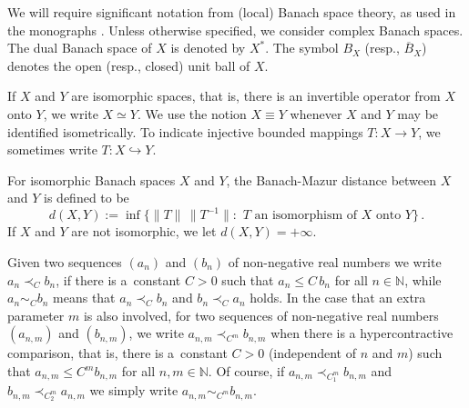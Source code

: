 \documentclass[12pt]{amsart}
\numberwithin{subsection}{section}
\theoremstyle{definition}
\theoremstyle{remark}
\begin{document}
We will require significant notation from (local) Banach space theory, as used in the monographs \cite{diestel1995absolutely, LT1,
pisier1986factorization, tomczak1989banach}. Unless otherwise specified, we consider complex Banach spaces. The dual Banach space
of $X$ is denoted by $X^\ast$.%
The symbol $B_X$
(resp., $\overline{B}_X$) denotes the open (resp., closed) unit ball of $X$.

If $X$ and $Y$ are isomorphic spaces, that is, there is an invertible operator from $X$ onto $Y$, we write $X\simeq Y$. We use the
notion $X\equiv Y$ whenever $X$ and $Y$ may be identified isometrically. To indicate injective bounded mappings $T\colon X \to Y$,
we sometimes write $T\colon X \hookrightarrow Y$.

For isomorphic Banach spaces $X$ and $Y$, the Banach-Mazur  distance between $X$ and $Y$ is defined to be
\[
d(X, Y):=\inf \big\{\|T\|\,\|T^{-1}\|: \,\, \text{$T$ an isomorphism of $X$ onto $Y$} \big\}\,.
\]
If $X$ and $Y$ are not isomorphic, we let $d(X, Y)= +\infty$.


Given two sequences $(a_n)$ and $(b_n)$ of non-negative real numbers we write $a_n \prec_C b_n$, if there is a~constant $C>0$ such
that $a_n \leq C\,b_n$ for all $n\in \mathbb{N}$, while $a_n \sim_C b_n$ means that $a_n \prec_C b_n$ and $b_n \prec_C a_n$ holds.
In the case that an extra parameter $m$ is also involved, for two sequences of non-negative real numbers $(a_{n,m})$ and $(b_{n,m})$,
we write $a_{n,m} \prec_{C^m} b_{n,m}$ when there is a hypercontractive comparison, that is, there is a~constant $C>0$ (independent
of $n$ and $m$) such that $a_{n,m} \leq C^m b_{n,m}$ for all $n,m \in \mathbb{N}$. Of course, if $a_{n,m} \prec_{C_1^m} b_{n,m}$ and
$b_{n,m} \prec_{C_2^m} a_{n,m}$ we simply write $a_{n,m} \sim_{C^m} b_{n,m}$.
\end{document}
